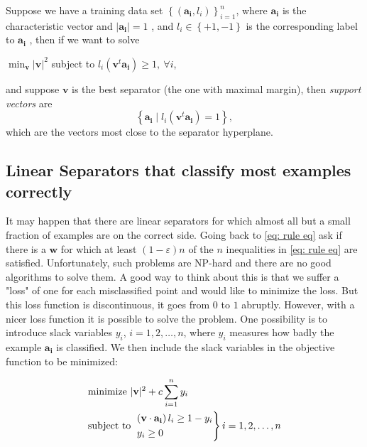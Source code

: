 \begin{definition}
    Suppose we have a training data set \(\left\{ (\mathbf{a_i}, l_i ) \right\}_{i=1}^n \), where \(\mathbf{a_i} \) is the characteristic vector and \(\vert \mathbf{a_i}  \vert = 1 \) , and \(l_i \in \left\{ +1, -1 \right\} \) is the corresponding label to \(\mathbf{a_i} \) , then if we want to solve
    \begin{center}
    \(\min _\mathbf{v} \vert \mathbf{v}  \vert^2 \) subject to \(l_i \left( \mathbf{v} ^t \mathbf{a_i}  \right) \ge 1, \ \forall i \),
\end{center}  
    and suppose \(\mathbf{v} \) is the best separator (the one with maximal margin), then \textit{support vectors} are
    \[
        \left\{ \mathbf{a_i} \mid l_i \left( \mathbf{v} ^t \mathbf{a_i}  \right)  = 1  \right\},
    \] which are the vectors most close to the separator hyperplane.
\end{definition}

\subsection{Linear Separators that classify most examples correctly}
It may happen that there are linear separators for which almost all but a small fraction of examples are on the correct side. Going back to \autoref{eq: rule eq} ask if there is a \(\mathbf{w} \) for which at least \((1 - \varepsilon )n\) of the \(n\) inequalities in \autoref{eq: rule eq} are satisfied. Unfortunately, such problems are NP-hard and there are no good algorithms to solve them. A good way to think about this is that we suffer a "loss" of one for each misclassified point and would like to minimize the loss. But this loss function is discontinuous, it goes from \(0\) to \(1\) abruptly. However, with a nicer loss function it is possible to solve the problem. One possibility is to introduce slack variables \(y_i\), \(i=1,2,\dots ,n\), where \(y_i\) measures how badly the example \(\mathbf{a_i} \) is classified. We then include the slack variables in the objective function to be minimized: 

\begin{equation}
    \begin{aligned}
        &\text{minimize } \vert \mathbf{v}  \vert^2 + c \sum_{i=1}^n y_i \\
        &\text{subject to } \begin{rcases}
            \left( \mathbf{v} \cdot \mathbf{a_i}  \right) l_i \ge 1 - y_i\\
            y_i \ge 0
        \end{rcases} i = 1,2, \dots ,n 
    \end{aligned}
\end{equation}

